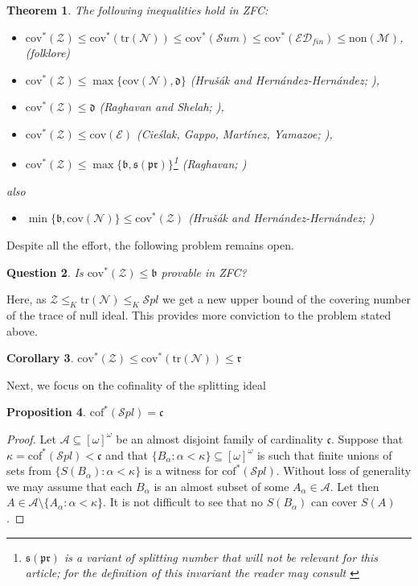 \documentclass[a4paper]{amsart}
\newtheorem{theorem}{Theorem}[section]
\newtheorem{proposition}[theorem]{Proposition}
\newtheorem{corollary}[theorem]{Corollary}
\newtheorem{question}[theorem]{Question}
\newcommand{\bbb}{\mathfrak{b}}
\newcommand{\ddd}{\mathfrak{d}}
\newcommand{\sss}{\mathfrak{s}}
\newcommand{\rrr}{\mathfrak{r}}
\newcommand{\continuum}{\mathfrak{c}}
\newcommand{\Meager}{\mathcal{M}}
\newcommand{\Null}{\mathcal{N}}
\newcommand{\E}{\mathcal{E}}
\newcommand{\cof}{\mathrm{cof}}
\newcommand{\cov}{\mathrm{cov}}
\newcommand{\non}{\mathrm{non}}
\newcommand{\ED}{\mathcal{ED}}
\newcommand{\Z}{\mathcal{Z}}
\newcommand{\SUM}{\mathcal{S}um}
\newcommand{\SPL}{\mathcal{S}pl}
\newcommand{\trN}{\mathrm{tr}(\Null)}
\begin{document}
\begin{theorem}
    The following inequalities hold in ZFC:
        \begin{itemize}
            \item[--] $\cov^{*}(\Z)\leq \cov^{*}(\trN)\leq\cov^{*}(\SUM)\leq \cov^{*}(\ED_{fin})\leq \non(\Meager)$, (folklore)
            \item[--] $\cov^{*}(\Z)\leq \max\{\cov(\Null),\ddd\}$  (Hrušák and Hern\'{a}ndez-Hern\'{a}ndez; \cite{Hernand}),
            \item[--] $\cov^{*}(\Z)\leq\ddd$ (Raghavan and Shelah; \cite{RaghavanShelah}),
            \item[--] $\cov^{*}(\Z)\leq\cov(\E)$ (Cieślak, Gappo, Martínez, Yamazoe; \cite{CIESGAPPOYAMAZOEMARTINEZ}),
            \item[--] $\cov^{*}(\Z)\leq\max\{\bbb,\sss(\mathfrak{pr})\}$\footnote{$\sss(\mathfrak{pr})$ is a variant of splitting number that will not be relevant for this article; for the definition of this invariant the reader may consult \cite{Raghavan}} (Raghavan; \cite{Raghavan})
        \end{itemize}
        also
        \begin{itemize}
            \item[--] $\min\{\bbb,\cov(\Null)\}\leq\cov^{*}(\Z)$ (Hrušák and Hern\'{a}ndez-Hern\'{a}ndez; \cite{Hernand})
        \end{itemize}
\end{theorem}
Despite all the effort, the following problem remains open.
\begin{question}
    Is $\cov^{*}(\Z)\leq\bbb$ provable in ZFC?
\end{question}
Here, as $\Z\leq_{K}\trN\leq_{K}\SPL$ we get a new upper bound of the covering number of the trace of null ideal. This provides more conviction to the problem stated above.
\begin{corollary}
    $\cov^{*}(\Z)\leq\cov^{*}(\trN)\leq\rrr$
\end{corollary}
Next, we focus on the cofinality of the splitting ideal
\begin{proposition}\label{cofSPL}
    $\cof^{*}(\SPL)=\continuum$
\end{proposition}
\begin{proof}
    Let $\mathcal{A}\subseteq[\omega]^{\omega}$ be an almost disjoint family of cardinality $\continuum$. Suppose that $\kappa=\cof^{*}(\SPL)<\continuum$ and that $\{B_{\alpha}:\alpha<\kappa\}\subseteq[\omega]^{\omega}$ is such that finite unions of sets from $\{S(B_{\alpha}):\alpha<\kappa\}$ is a witness for $\cof^{*}(\SPL)$. Without loss of generality we may assume that each $B_{\alpha}$ is an almost subset of some $A_{\alpha}\in\mathcal{A}$. Let then $A\in\mathcal{A}\setminus\{A_{\alpha}:\alpha<\kappa\}$. It is not difficult to see that no $S(B_{\alpha})$ can cover $S(A)$.
\end{proof}
\end{document}
